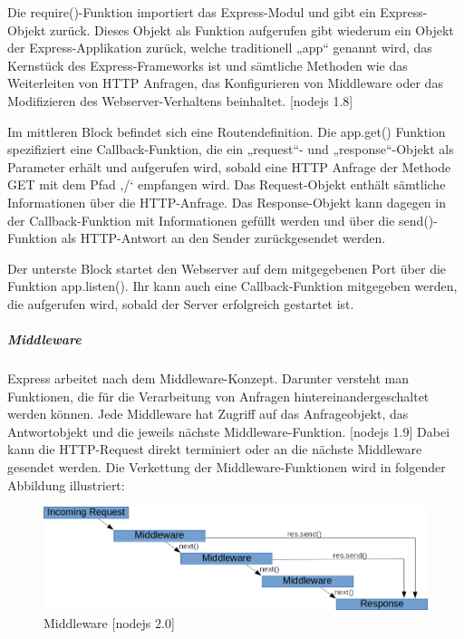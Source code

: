 \noindent
Die require()-Funktion importiert das Express-Modul und gibt ein Express-Objekt zurück. 
Dieses Objekt als Funktion aufgerufen gibt wiederum ein Objekt der Express-Applikation zurück, welche traditionell „app“ genannt wird, das Kernstück des Express-Frameworks ist und sämtliche Methoden wie das Weiterleiten von HTTP Anfragen, das Konfigurieren von Middleware oder das Modifizieren des Webserver-Verhaltens beinhaltet. [nodejs 1.8]\newline 

\noindent
Im mittleren Block befindet sich eine Routendefinition. Die app.get() Funktion spezifiziert eine Callback-Funktion, die ein „request“- und „response“-Objekt als Parameter erhält und aufgerufen wird, sobald eine HTTP Anfrage der Methode GET mit dem Pfad ‚/‘ empfangen wird. Das Request-Objekt enthält sämtliche Informationen über die HTTP-Anfrage. Das Response-Objekt kann dagegen in der Callback-Funktion mit Informationen gefüllt werden und über die send()-Funktion als HTTP-Antwort an den Sender zurückgesendet werden.\newline

\noindent
Der unterste Block startet den Webserver auf dem mitgegebenen Port über die Funktion app.listen(). Ihr kann auch eine Callback-Funktion mitgegeben werden, die aufgerufen wird, sobald der Server erfolgreich gestartet ist.\newpage

\subparagraph{Middleware}
Express arbeitet nach dem Middleware-Konzept. Darunter versteht man Funktionen, die für die Verarbeitung von Anfragen hintereinandergeschaltet werden können. Jede Middleware hat Zugriff auf das Anfrageobjekt, das Antwortobjekt und die jeweils nächste Middleware-Funktion. [nodejs 1.9]
Dabei kann die HTTP-Request direkt terminiert oder an die nächste Middleware gesendet werden. Die Verkettung der Middleware-Funktionen wird in folgender Abbildung illustriert: \newline



\begin{figure}[h]
\centering
\includegraphics[width=12cm]{images/nodejs_middleware.png}
\caption{Middleware [nodejs 2.0]}
\end{figure}


